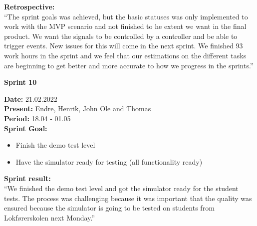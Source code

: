 \textbf{Retrospective:} \\
“The sprint goals was achieved, but the basic statuses was only implemented to work with the MVP scenario and not finished to he extent we want in the final product. We want the signals to be controlled by a controller and be able to trigger events. New issues for this will come in the next sprint. We finished 93 work hours in the sprint and we feel that our estimations on the different tasks are beginning to get better and more accurate to how we progress in the sprints.”

\begin{large}
    \textbf{Sprint 10} \\
\end{large}
\textbf{Date:} 21.02.2022 \\ 
\textbf{Present:} Endre, Henrik, John Ole and Thomas \\
\textbf{Period:} 18.04 - 01.05 \\ 

\textbf{Sprint Goal:}
\begin{itemize}
    \item Finish the demo test level
    \item Have the simulator ready for testing (all functionality ready)
\end{itemize}

\textbf{Sprint result:} \\
“We finished the demo test level and got the simulator ready for the student tests. The process was challenging because it was important that the quality was ensured because the simulator is going to be tested on students from Lokførerskolen next Monday.”

